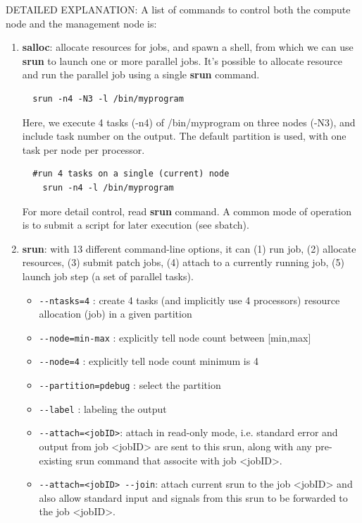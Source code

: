 DETAILED EXPLANATION: A list of commands to control both the compute node and
the management node is: 
\begin{enumerate}
  \item {\bf salloc}: allocate resources for jobs, and spawn a shell, from which
  we can use {\bf srun} to launch one or more parallel jobs. It's possible to
  allocate resource and run the parallel job using a single {\bf srun} command. 
  \begin{verbatim}
  srun -n4 -N3 -l /bin/myprogram 
  \end{verbatim}
  Here, we execute 4 tasks (-n4) of /bin/myprogram on three nodes (-N3), and
  include task number on the output. The default partition is used, with one task per node per
  processor.
  \begin{verbatim}
  #run 4 tasks on a single (current) node 
    srun -n4 -l /bin/myprogram  
  \end{verbatim}
  
  For more detail control, read {\bf srun} command. A common mode of operation
  is to submit a script for later execution (see sbatch). 

  \item {\bf srun}: with 13 different command-line options, it can (1) run job,
  (2) allocate resources, (3) submit patch jobs, (4) attach to a currently
  running job, (5) launch job step (a set of parallel tasks).
   \begin{itemize}
     \item \verb!--ntasks=4! : create 4 tasks (and implicitly use 4 processors)
     resource allocation (job) in a given partition
     \item \verb!--node=min-max! : explicitly tell node count between [min,max]
     \item \verb!--node=4! : explicitly tell node count minimum is 4
     \item \verb!--partition=pdebug! : select the partition
     \item \verb!--label! : labeling the output
     \item \verb!--attach=<jobID>!: attach in read-only mode, i.e. standard
     error and output from job <jobID> are sent to this srun, along with any
     pre-existing srun command that associte with job <jobID>.
     \item \verb!--attach=<jobID> --join!: attach current srun to the job
     <jobID> and also allow standard input and signals from this srun to be
     forwarded to the job <jobID>.
     

\end{itemize}
\end{enumerate}
